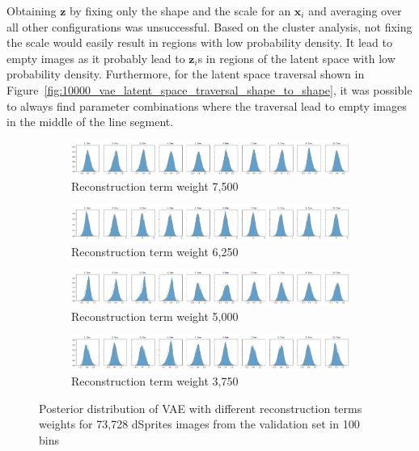 Obtaining $\bm{z}$ by fixing only the shape and the scale for an $\bm{x}_i$ and averaging over all other configurations was unsuccessful.
Based on the cluster analysis, not fixing the scale would easily result in regions with low probability density.
It lead to empty images as it probably lead to $\bm{z}_i$s in regions of the latent space with low probability density.
Furthermore, for the latent space traversal shown in Figure~\ref{fig:10000_vae_latent_space_traversal_shape_to_shape}, it was possible to always find parameter combinations where the traversal lead to empty images in the middle of the line segment.

\begin{figure}
    \centering
    \begin{subfigure}{\textwidth}
        \centering
        \includegraphics[width=\textwidth]{images/latent_space_entanglement/vae_dsprites_lf_7500_dist.png}
        \caption{Reconstruction term weight 7,500}
    \end{subfigure}
    \begin{subfigure}{\textwidth}
        \centering
        \includegraphics[width=\textwidth]{images/latent_space_entanglement/vae_dsprites_lf_6250_dist.png}
        \caption{Reconstruction term weight 6,250}
    \end{subfigure}
    \begin{subfigure}{\textwidth}
        \centering
        \includegraphics[width=\textwidth]{images/latent_space_entanglement/vae_dsprites_lf_5000_dist.png}
        \caption{Reconstruction term weight 5,000}
    \end{subfigure}
    \begin{subfigure}{\textwidth}
        \centering
        \includegraphics[width=\textwidth]{images/latent_space_entanglement/vae_dsprites_lf_3750_dist.png}
        \caption{Reconstruction term weight 3,750}
    \end{subfigure}
    \caption[VAE Latent Space Distribution - Different Reconstruction Term Weights]{Posterior distribution of VAE with different reconstruction terms weights for 73,728 dSprites images from the validation set in 100 bins}
    \label{fig:7500_5000_vae_latent_space_distribution_scales_and_shapes}
\end{figure}

